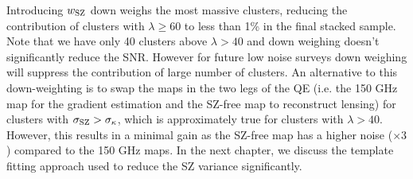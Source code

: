 Introducing $w_{\rm SZ}$ down weighs the most massive clusters, reducing the contribution
of clusters with $\lambda \ge 60$ to less than 1\% in the final stacked sample. 
Note that we have only 40 clusters above $\lambda > 40$ and down weighing doesn't significantly reduce the SNR. 
However for future low noise surveys down weighing will suppress the contribution of large number of clusters.
An alternative to this down-weighting is to swap the maps in the two legs of the QE (i.e. the 150 GHz map for the gradient estimation and the SZ-free map to reconstruct lensing) for clusters with \mbox{$\sigma_{\rm SZ} > \sigma_{\kappa}$}, which is approximately true for clusters with $\lambda > 40$. However, this results in a minimal gain as the \sptpol{} SZ-free map has a higher noise ($\times3$) compared to the \sptpol{} 150 GHz maps. 
In the next chapter, we discuss the template fitting approach used to reduce the SZ variance significantly.
